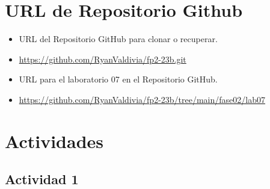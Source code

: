 \documentclass{article}
\begin{document}
	\section{URL de Repositorio Github}
	\begin{itemize}
		\item URL del Repositorio GitHub para clonar o recuperar.
		\item \url{https://github.com/RyanValdivia/fp2-23b.git}
		\item URL para el laboratorio 07 en el Repositorio GitHub.
		\item \url{https://github.com/RyanValdivia/fp2-23b/tree/main/fase02/lab07}
	\end{itemize}
	
	\section{Actividades}
	\subsection{Actividad 1}
	
\end{document}
